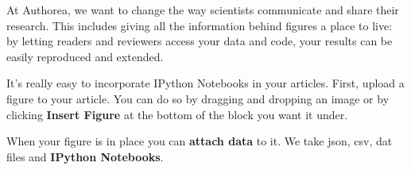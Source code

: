 At Authorea, we want to change the way scientists communicate and share their research. This includes giving all the information behind figures a place to live: by letting readers and reviewers access your data and code, your results can be easily reproduced and extended.

It's really easy to incorporate IPython Notebooks in your articles.  First, upload a figure to your article. You can do so by dragging and dropping an image or by clicking \textbf{Insert Figure} at the bottom of the block you want it under.  

When your figure is in place you can \textbf{attach data} to it. We take json, csv, dat files and \textbf{IPython Notebooks}. 